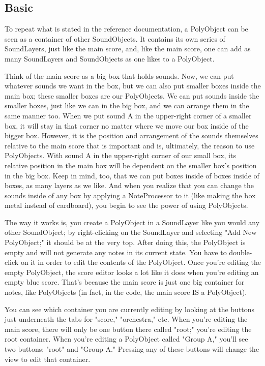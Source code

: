 \subsection{Basic}

To repeat what is stated in the reference documentation, a PolyObject
can be seen as a container of other SoundObjects. It contains its own
series of SoundLayers, just like the main score, and, like the main
score, one can add as many SoundLayers and SoundObjects as one likes to
a PolyObject.

Think of the main score as a big box that holds sounds. Now, we can put
whatever sounds we want in the box, but we can also put smaller boxes
inside the main box; these smaller boxes are our PolyObjects. We can put
sounds inside the smaller boxes, just like we can in the big box, and we
can arrange them in the same manner too. When we put sound A in the
upper-right corner of a smaller box, it will stay in that corner no
matter where we move our box inside of the bigger box. However, it is
the position and arrangement of the sounds themselves relative to the
main score that is important and is, ultimately, the reason to use
PolyObjects. With sound A in the upper-right corner of our small box,
its relative position in the main box will be dependent on the smaller
box's position in the big box. Keep in mind, too, that we can put boxes
inside of boxes inside of boxes, as many layers as we like. And when you
realize that you can change the sounds inside of any box by applying a
NoteProcessor to it (like making the box metal instead of cardboard),
you begin to see the power of using PolyObjects.

The way it works is, you create a PolyObject in a SoundLayer like you
would any other SoundObject; by right-clicking on the SoundLayer and
selecting "Add New PolyObject;" it should be at the very top. After
doing this, the PolyObject is empty and will not generate any notes in
its current state. You have to double-click on it in order to edit the
contents of the PolyObject. Once you're editing the empty PolyObject,
the score editor looks a lot like it does when you're editing an empty
blue score. That's because the main score is just one big container for
notes, like PolyObjects (in fact, in the code, the main score IS a
PolyObject).

You can see which container you are currently editing by looking at the
buttons just underneath the tabs for "score," "orchestra," etc. When
you're editing the main score, there will only be one button there
called "root;" you're editing the root container. When you're editing a
PolyObject called "Group A," you'll see two buttons; "root" and "Group
A." Pressing any of these buttons will change the view to edit that
container.


